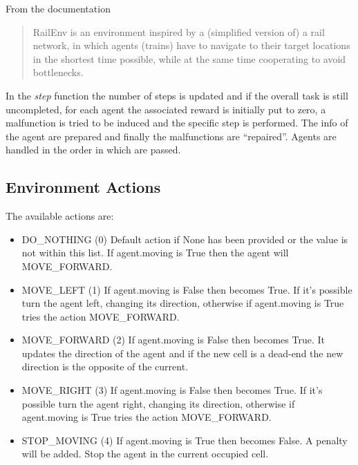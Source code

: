 \documentclass[11pt, a4paper, hidelinks]{report}
\begin{document}
From the documentation
\begin{quotation}
	RailEnv is an environment inspired by a (simplified version of) a rail
    network, in which agents (trains) have to navigate to their target
    locations in the shortest time possible, while at the same time cooperating
    to avoid bottlenecks.
\end{quotation}

In the \textit{step} function the number of steps is updated and if the overall task is still uncompleted, for each agent the associated reward is initially put to zero, a malfunction is tried to be induced and the specific step is performed.
The info of the agent are prepared and finally the malfunctions are ``repaired''.
Agents are handled in the order in which are passed.

\subsection{Environment Actions}\label{subsec:environment-actions}
The available actions are:
\begin{itemize}
	\item DO\_NOTHING (0) Default action if None has been provided or the value is not within this list.
If agent.moving is True then the agent will MOVE\_FORWARD\@.
    \item MOVE\_LEFT (1) If agent.moving is False then becomes True.
If it's possible turn the agent left, changing its direction, otherwise if agent.moving is True tries the action MOVE\_FORWARD\@.
    \item MOVE\_FORWARD (2) If agent.moving is False then becomes True.
It updates the direction of the agent and if the new cell is a dead-end the new direction is the opposite of the current.
    \item MOVE\_RIGHT (3) If agent.moving is False then becomes True.
If it's possible turn the agent right, changing its direction, otherwise if agent.moving is True tries the action MOVE\_FORWARD\@.
    \item STOP\_MOVING (4) If agent.moving is True then becomes False.
A penalty will be added.
Stop the agent in the current occupied cell.
\end{itemize}
\end{document}
